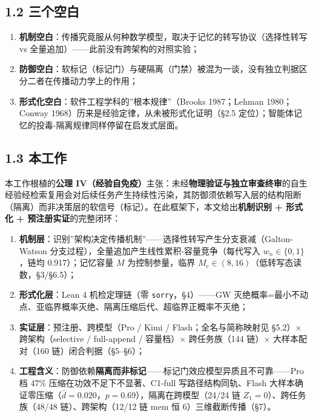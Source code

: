 \documentclass[
]{ctexart}
\providecommand{\tightlist}{%
  \setlength{\itemsep}{0pt}\setlength{\parskip}{0pt}}
\begin{document}
\subsection{1.2 三个空白}\label{ux4e09ux4e2aux7a7aux767d}

\begin{enumerate}
\def\labelenumi{\arabic{enumi}.}
\tightlist
\item
  \textbf{机制空白}：传播究竟服从何种数学模型，取决于记忆的转写协议（选择性转写
  vs 全量追加）------此前没有跨架构的对照实验；
\item
  \textbf{防御空白}：软标记（标记门）与硬隔离（门禁）被混为一谈，没有独立判据区分二者在传播动力学上的作用；
\item
  \textbf{形式化空白}：软件工程学科的''根本规律''（Brooks 1987；Lehman
  1980；Conway 1968）历来是经验定律，从未被形式化证明（§2.5
  定位）；智能体记忆的投毒-隔离规律同样停留在启发式层面。
\end{enumerate}

\subsection{1.3 本工作}\label{ux672cux5de5ux4f5c}

本工作根植的\textbf{公理
IV（经验自免疫）}主张：未经\textbf{物理验证与独立审查终审}的自生经验经检索复用会对后续任务产生持续性污染，其防御须依赖写入层的结构阻断（隔离）而非决策层的软信号（标记）。在此框架下，本文给出\textbf{机制识别
+ 形式化 + 预注册实证}的完整闭环：

\begin{enumerate}
\def\labelenumi{\arabic{enumi}.}
\tightlist
\item
  \textbf{机制层}：识别''架构决定传播机制''------选择性转写产生分支衰减（Galton-Watson
  分支过程），全量追加产生线性累积-容量竞争（每代写入
  \(w_n\in\{0,1\}\)，链均 0.917）；记忆容量 \(M\) 为控制参量，临界
  \(M_c\in(8,16)\)（低转写态读数，§3/§6.5）；
\item
  \textbf{形式化层}：Lean 4 机检定理链（零 \texttt{sorry}，§4）------GW
  灭绝概率=最小不动点、亚临界概率灭绝、隔离压缩后代、超临界正概率不灭绝；
\item
  \textbf{实证层}：预注册、跨模型（Pro / Kimi / Flash；全名与简称映射见
  §5.2）× 跨架构（selective / full-append / 容量档）× 跨任务族（144
  链）× 大样本配对（160 链）闭合判据（§5--§6）；
\item
  \textbf{工程含义}：防御依赖\textbf{隔离而非标记}------标记门效应模型异质且不可靠------Pro
  档 47\% 压缩在功效不足下不显著、C1-full 写路径结构同轨、Flash
  大样本确证零压缩（\(\bar d=0.020\)，\(p=0.69\)），隔离在跨模型（24/24
  链 \(Z_1=0\)）、跨任务族（48/48 链）、跨架构（12/12 链 mem 恒
  6）三维截断传播（§7）。
\end{enumerate}
\end{document}
